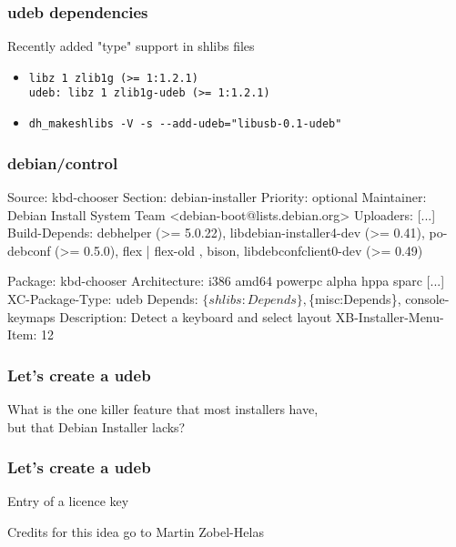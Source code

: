 \documentclass{beamer}
\begin{document}
\begin{frame}[fragile]
  \frametitle{udeb dependencies}
	Recently added "type" support in shlibs files
	\begin{itemize}
	\item
		\begin{small}
		\begin{verbatim}
libz 1 zlib1g (>= 1:1.2.1)
udeb: libz 1 zlib1g-udeb (>= 1:1.2.1)
		\end{verbatim}
		\end{small}
	\item
		\begin{small}
		\begin{verbatim}
dh_makeshlibs -V -s --add-udeb="libusb-0.1-udeb"
		\end{verbatim}
		\end{small}
	\end{itemize}
\end{frame}

\begin{frame}[fragile]
  \frametitle{debian/control}
\begin{tiny}
\begin{semiverbatim}
Source: kbd-chooser
Section: debian-installer
Priority: optional
Maintainer: Debian Install System Team <debian-boot@lists.debian.org>
Uploaders: [...]
Build-Depends: debhelper (>= 5.0.22), libdebian-installer4-dev (>= 0.41),
               po-debconf (>= 0.5.0), flex | flex-old , bison,
               libdebconfclient0-dev (>= 0.49)

Package: kbd-chooser
Architecture: i386 amd64 powerpc alpha hppa sparc [...]
\color{red}XC-Package-Type: udeb\normalcolor
Depends: $\{shlibs:Depends\}, $\{misc:Depends\}, console-keymaps
Description: Detect a keyboard and select layout
\color{red}XB-Installer-Menu-Item: 12\normalcolor
\end{semiverbatim}
\end{tiny}
\end{frame}

\begin{frame}
  \frametitle{Let's create a udeb}
	What is the one killer feature that most installers have, \\
	but that Debian Installer lacks?
\end{frame}

\begin{frame}
  \frametitle{Let's create a udeb}
\begin{huge}
	Entry of a licence key
\end{huge}
\bigskip
\bigskip
\begin{tiny}
\begin{flushright}
Credits for this idea go to Martin Zobel-Helas
\end{flushright}
\end{tiny}
\end{frame}
\end{document}

